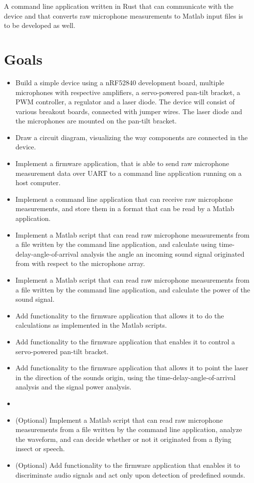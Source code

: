 \documentclass[a4paper]{article}
\begin{document}
A command line application written in Rust that can communicate with the device and that converts raw microphone measurements to Matlab input files is to be developed as well.

\section{Goals}
\begin{itemize}
    \item Build a simple device using a nRF52840 development board, multiple microphones with respective amplifiers, a servo-powered pan-tilt bracket, a PWM controller, a regulator and a laser diode. The device will consist of various breakout boards, connected with jumper wires. The laser diode and the microphones are mounted on the pan-tilt bracket.
    \item Draw a circuit diagram, visualizing the way components are connected in the device.
    \item Implement a firmware application, that is able to send raw microphone measurement data over UART\cite{uart} to a command line application running on a host computer.
    \item Implement a command line application that can receive raw microphone measurements, and store them in a format that can be read by a Matlab application.
    \item Implement a Matlab script that can read raw microphone measurements from a file written by the command line application, and calculate using time-delay-angle-of-arrival analysis the angle an incoming sound signal originated from with respect to the microphone array.
    \item Implement a Matlab script that can read raw microphone measurements from a file written by the command line application, and calculate the power of the sound signal.
    \item Add functionality to the firmware application that allows it to do the calculations as implemented in the Matlab scripts.
    \item Add functionality to the firmware application that enables it to control a servo-powered pan-tilt bracket.

    \item Add functionality to the firmware application that allows it to point the laser in the direction of the sounds origin, using the time-delay-angle-of-arrival analysis and the signal power analysis.
    \item \item (Optional) Implement a Matlab script that can read raw microphone measurements from a file written by the command line application, analyze the waveform, and can decide whether or not it originated from a flying insect or speech.
    \item (Optional) Add functionality to the firmware application that enables it to discriminate audio signals and act only upon detection of predefined sounds.
\end{itemize}
\end{document}
